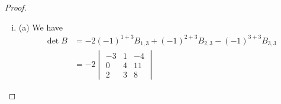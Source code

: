 \begin{proof}
\begin{enumerate}[(i)]
\begin{alignat*}{2}
\begin{sysmatrix}{cccc}
                1 & 2 & 3 & 2\\
                0 & -1 & 7 & -2\\
                0 & 0 & 2 & 1\\
                0 & -4 & -3 & -3
            \end{sysmatrix}
            \ro{R_4-4R_2}
            \begin{sysmatrix}{cccc}
                1 & 2 & 3 & 2\\
                0 & -1 & 7 & -2\\
                0 & 0 & 2 & 1\\
                0 & 0 & -31 & 5
            \end{sysmatrix}\\
            &\ro{R_4+15.5R_3}
            \begin{sysmatrix}{cccc}
                1 & 2 & 3 & 2\\
                0 & -1 & 7 & -2\\
                0 & 0 & 2 & 1\\
                0 & 0 & 0 & 20.5
            \end{sysmatrix}
        \end{alignat*}
        Since every elementary row operation consists of adding one row with a scalar multiple of another row, the determinant stays the same. Moreover, since the row echolon matrix is triangular, it follows that 
        \[
            \begin{aligned}
                |A|=\begin{vmatrix}
                    1 & 2 & 3 & 2\\
                    0 & -1 & 7 & -2\\
                    0 & 0 & 2 & 1\\
                    0 & 0 & 0 & 20.5
                \end{vmatrix}=1\times -1\times 2\times 20.5=-41
            \end{aligned}
        \]
        \item (a) We have 
        \[
            \begin{aligned}
                \det B
                &=-2(-1)^{1+3}B_{1,3}+(-1)^{2+3}B_{2,3}-(-1)^{3+3}B_{3,3}\\
                &=-2\begin{vmatrix}
                    -3 & 1 & -4\\
                    0 & 4 & 11\\
                    2 & 3 & 8

\end{vmatrix}
\end{aligned}\]
\end{enumerate}
\end{proof}
